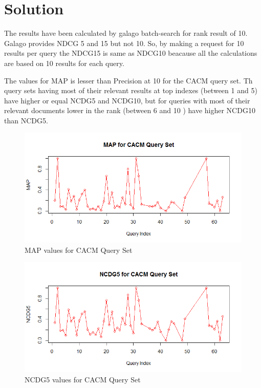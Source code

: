 \documentclass[12pt]{report}
\begin{document}
\section{Solution}
The results have been calculated by galago batch-search for rank result of 10. Galago provides NDCG 5 and 15 but not 10. So, by making a request for 10 results per query the NDCG15 is same as NDCG10 beacause all the calculations are based on 10 results for each query.

The values for MAP is lesser than Precision at 10 for the CACM query set. Th query sets having most of their relevant results at top indexes (between 1 and 5) have higher or equal NCDG5 and NCDG10, but for queries with most of their relevant documents lower in the rank (between 6 and 10 ) have higher NCDG10 than NCDG5. 
\begin{figure}[ht]
  \centering
  \includegraphics[width=1\textwidth]{Problem8_5/MAP.png}
  \caption{MAP values for CACM Query Set}
  \label{fig:1}
\end{figure}

\begin{figure}[ht]
  \centering
  \includegraphics[width=1\textwidth]{Problem8_5/NCDG5.png}
  \caption{NCDG5 values for CACM Query Set}
  \label{fig:1}
\end{figure}
\end{document}

